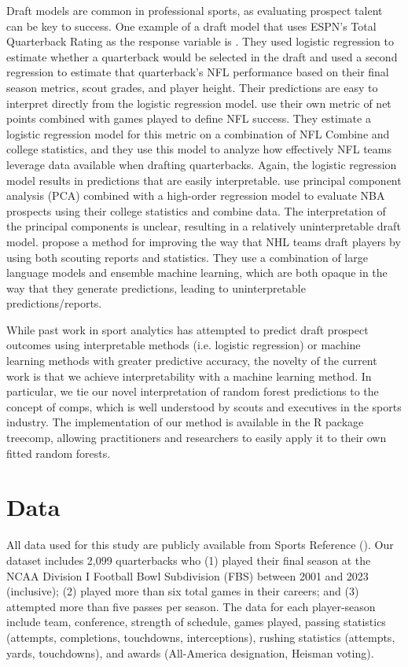 \documentclass{article}
\begin{document}
Draft models are common in professional sports, as evaluating prospect talent can be key to success. One example of a draft model that uses ESPN's Total Quarterback Rating as the response variable is \textcite{craig_predicting_2021}. They used logistic regression to estimate whether a quarterback would be selected in the draft and used a second regression to estimate that quarterback's NFL performance based on their final season metrics, scout grades, and player height. Their predictions are easy to interpret directly from the logistic regression model. \textcite{wolfson_quarterback_2011} use their own metric of net points combined with games played to define NFL success. They estimate a logistic regression model for this metric on a combination of NFL Combine and college statistics, and they use this model to analyze how effectively NFL teams leverage data available when drafting quarterbacks. Again, the logistic regression model results in predictions that are easily interpretable. \textcite{berger_jumping_2021} use principal component analysis (PCA) combined with a high-order regression model to evaluate NBA prospects using their college statistics and combine data. The interpretation of the principal components is unclear, resulting in a relatively uninterpretable draft model. \textcite{luo_improving_2024} propose a method for improving the way that NHL teams draft players by using both scouting reports and statistics. They use a combination of large language models and ensemble machine learning, which are both opaque in the way that they generate predictions, leading to uninterpretable predictions/reports.

While past work in sport analytics has attempted to predict draft prospect outcomes using interpretable methods (i.e. logistic regression) or machine learning methods with greater predictive accuracy, the novelty of the current work is that we achieve interpretability with a machine learning method. In particular, we tie our novel interpretation of random forest predictions to the concept of comps, which is well understood by scouts and executives in the sports industry. The implementation of our method is available in the R package treecomp, allowing practitioners and researchers to easily apply it to their own fitted random forests.

\section{Data}
\label{sec:data}

All data used for this study are publicly available from Sports Reference (\cite{sports_reference_sports_2025}). Our dataset includes 2,099 quarterbacks who (1) played their final season at the NCAA Division I Football Bowl Subdivision (FBS) between 2001 and 2023 (inclusive); (2) played more than six total games in their careers; and (3) attempted more than five passes per season. The data for each player-season include team, conference, strength of schedule, games played, passing statistics (attempts, completions, touchdowns, interceptions), rushing statistics (attempts, yards, touchdowns), and awards (All-America designation, Heisman voting).
\end{document}
